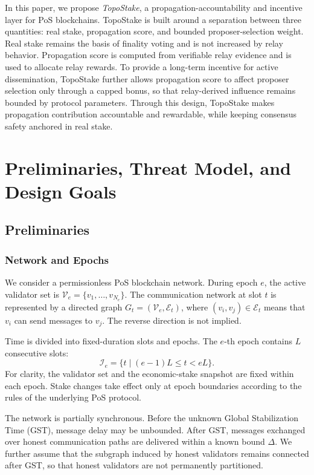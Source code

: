 \documentclass[lettersize,journal]{IEEEtran}
\begin{document}
In this paper, we propose \emph{TopoStake}, a propagation-accountability and incentive layer for PoS blockchains.
TopoStake is built around a separation between three quantities: real stake, propagation score, and bounded proposer-selection weight.
Real stake remains the basis of finality voting and is not increased by relay behavior.
Propagation score is computed from verifiable relay evidence and is used to allocate relay rewards.
To provide a long-term incentive for active dissemination, TopoStake further allows propagation score to affect proposer selection only through a capped bonus, so that relay-derived influence remains bounded by protocol parameters.
Through this design, TopoStake makes propagation contribution accountable and rewardable, while keeping consensus safety anchored in real stake.


\section{Preliminaries, Threat Model, and Design Goals}
\label{sec:system_model}

\subsection{Preliminaries}
\label{subsec:preliminaries}

\subsubsection{Network and Epochs}

We consider a permissionless PoS blockchain network.
During epoch $e$, the active validator set is
$\mathcal{V}_e=\{v_1,\dots,v_{N_e}\}$.
The communication network at slot $t$ is represented by a directed graph
$G_t=(\mathcal{V}_e,\mathcal{E}_t)$, where
$(v_i,v_j)\in\mathcal{E}_t$ means that $v_i$ can send messages to $v_j$.
The reverse direction is not implied.

Time is divided into fixed-duration slots and epochs.
The $e$-th epoch contains $L$ consecutive slots:
\begin{equation}
\mathcal{I}_e
=
\{t\mid (e-1)L\leq t<eL\}.
\end{equation}
For clarity, the validator set and the economic-stake snapshot are fixed within each epoch.
Stake changes take effect only at epoch boundaries according to the rules of the underlying PoS protocol.

The network is partially synchronous.
Before the unknown Global Stabilization Time (GST), message delay may be unbounded.
After GST, messages exchanged over honest communication paths are delivered within a known bound $\Delta$.
We further assume that the subgraph induced by honest validators remains connected after GST, so that honest validators are not permanently partitioned.
\end{document}

